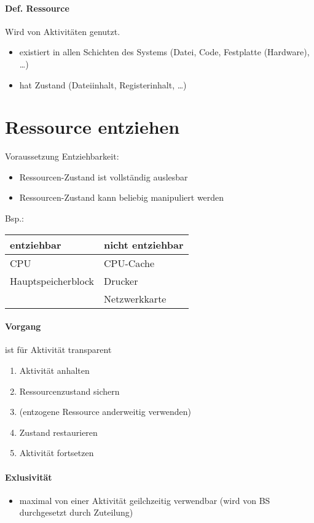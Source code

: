 \documentclass{scrreprt}
\renewcommand{\imptnt}[1]{#1}
\begin{document}
\paragraph{Def. Ressource}
Wird von Aktivitäten genutzt.
\begin{itemize}
\item existiert in allen Schichten des Systems (Datei, Code, Festplatte (Hardware), …)
\item hat Zustand (Dateiinhalt, Registerinhalt, …)
\end{itemize}
\section{Ressource entziehen}
Voraussetzung Entziehbarkeit:
\begin{itemize}
\item Ressourcen-Zustand ist \imptnt{vollständig auslesbar}
\item Ressourcen-Zustand \imptnt{kann beliebig manipuliert werden}
\end{itemize}
Bsp.:\\
\begin{tabular}{l | l}
entziehbar & nicht entziehbar\\
\hline
CPU & CPU-Cache\\
Hauptspeicherblock & Drucker\\
& Netzwerkkarte
\end{tabular}
\paragraph{Vorgang} ist für Aktivität transparent
\begin{enumerate}
\item Aktivität anhalten
\item Ressourcenzustand sichern
\item (entzogene Ressource anderweitig verwenden)
\item Zustand restaurieren
\item Aktivität fortsetzen
\end{enumerate}
\paragraph{Exlusivität} 
\begin{itemize}
\item maximal von einer Aktivität geilchzeitig verwendbar (wird von BS durchgesetzt durch Zuteilung)
\end{itemize}
\end{document}
